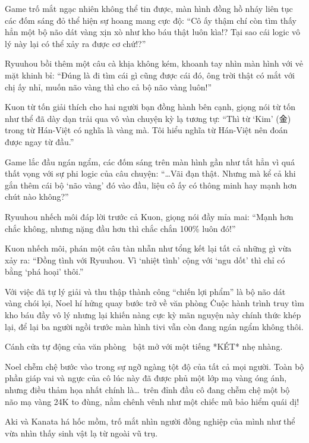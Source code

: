 \documentclass[../main.tex]{subfiles}
\begin{document}
Game trố mắt ngạc nhiên không thể tin được, màn hình đồng hồ nháy liên tục các đốm sáng đỏ thể hiện sự hoang mang cực độ: ``Cô ấy thậm chí còn tìm thấy hẳn một bộ não dát vàng xịn xò như kho báu thật luôn kìa!? Tại sao cái logic vô lý này lại có thể xảy ra được cơ chứ!?''

Ryuuhou bồi thêm một câu cà khịa không kém, khoanh tay nhìn màn hình với vẻ mặt khinh bỉ: ``Đúng là đi tìm cái gì cũng được cái đó, ông trời thật có mắt với chị ấy nhỉ, muốn não vàng thì cho cả bộ não vàng luôn!''

Kuon từ tốn giải thích cho hai người bạn đồng hành bên cạnh, giọng nói từ tốn như thể đã dày dạn trải qua vô vàn chuyện kỳ lạ tương tự: ``Thì từ `Kim' (金) trong từ Hán-Việt có nghĩa là vàng mà. Tôi hiểu nghĩa từ Hán-Việt nên đoán được ngay từ đầu.''

Game lắc đầu ngán ngẩm, các đốm sáng trên màn hình gần như tắt hẳn vì quá thất vọng với sự phi logic của câu chuyện: ``\dots Vãi đạn thật. Nhưng mà kể cả khi gắn thêm cái bộ `não vàng' đó vào đầu, liệu cô ấy có thông minh hay mạnh hơn chút nào không?''

Ryuuhou nhếch môi đáp lời trước cả Kuon, giọng nói đầy mỉa mai: ``Mạnh hơn chắc không, nhưng nặng đầu hơn thì chắc chắn 100\% luôn đó!''

Kuon nhếch môi, phán một câu tàn nhẫn như tổng kết lại tất cả những gì vừa xảy ra: ``Đồng tình với Ryuuhou. Vì `nhiệt tình' cộng với `ngu dốt' thì chỉ có bằng `phá hoại' thôi.''

Với việc đã tự lý giải và thu thập thành công ``chiến lợi phẩm'' là bộ não dát vàng chói lọi, Noel hí hửng quay bước trở về văn phòng \hll\. Cuộc hành trình truy tìm kho báu đầy vô lý nhưng lại khiến nàng cực kỳ mãn nguyện này chính thức khép lại, để lại ba người ngồi trước màn hình tivi vẫn còn đang ngán ngẩm không thôi.

\omk

Cánh cửa tự động của văn phòng \hll\ bật mở với một tiếng *KÉT* nhẹ nhàng.

Noel chễm chệ bước vào trong sự ngỡ ngàng tột độ của tất cả mọi người. Toàn bộ phần giáp vai và ngực của cô lúc này đã được phủ một lớp mạ vàng óng ánh, nhưng điều thảm họa nhất chính là\dots\ trên đỉnh đầu cô đang chễm chệ một bộ não mạ vàng 24K to đùng, nằm chênh vênh như một chiếc mũ bảo hiểm quái dị!

Aki và Kanata há hốc mồm, trố mắt nhìn người đồng nghiệp của mình như thể vừa nhìn thấy sinh vật lạ từ ngoài vũ trụ.
\end{document}
